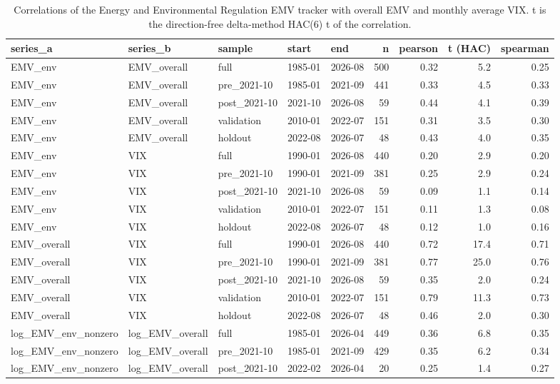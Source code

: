 \begin{table}
\caption{Correlations of the Energy and Environmental Regulation EMV tracker with overall EMV and monthly average VIX. t is the direction-free delta-method HAC(6) t of the correlation.}
\label{tab:m1_decomp_corr}
\begin{tabular}{lllllrrrr}
\toprule
series\_a & series\_b & sample & start & end & n & pearson & t (HAC) & spearman \\
\midrule
EMV\_env & EMV\_overall & full & 1985-01 & 2026-08 & 500 & 0.32 & 5.2 & 0.25 \\
EMV\_env & EMV\_overall & pre\_2021-10 & 1985-01 & 2021-09 & 441 & 0.33 & 4.5 & 0.33 \\
EMV\_env & EMV\_overall & post\_2021-10 & 2021-10 & 2026-08 & 59 & 0.44 & 4.1 & 0.39 \\
EMV\_env & EMV\_overall & validation & 2010-01 & 2022-07 & 151 & 0.31 & 3.5 & 0.30 \\
EMV\_env & EMV\_overall & holdout & 2022-08 & 2026-07 & 48 & 0.43 & 4.0 & 0.35 \\
EMV\_env & VIX & full & 1990-01 & 2026-08 & 440 & 0.20 & 2.9 & 0.20 \\
EMV\_env & VIX & pre\_2021-10 & 1990-01 & 2021-09 & 381 & 0.25 & 2.9 & 0.24 \\
EMV\_env & VIX & post\_2021-10 & 2021-10 & 2026-08 & 59 & 0.09 & 1.1 & 0.14 \\
EMV\_env & VIX & validation & 2010-01 & 2022-07 & 151 & 0.11 & 1.3 & 0.08 \\
EMV\_env & VIX & holdout & 2022-08 & 2026-07 & 48 & 0.12 & 1.0 & 0.16 \\
EMV\_overall & VIX & full & 1990-01 & 2026-08 & 440 & 0.72 & 17.4 & 0.71 \\
EMV\_overall & VIX & pre\_2021-10 & 1990-01 & 2021-09 & 381 & 0.77 & 25.0 & 0.76 \\
EMV\_overall & VIX & post\_2021-10 & 2021-10 & 2026-08 & 59 & 0.35 & 2.0 & 0.24 \\
EMV\_overall & VIX & validation & 2010-01 & 2022-07 & 151 & 0.79 & 11.3 & 0.73 \\
EMV\_overall & VIX & holdout & 2022-08 & 2026-07 & 48 & 0.46 & 2.0 & 0.30 \\
log\_EMV\_env\_nonzero & log\_EMV\_overall & full & 1985-01 & 2026-04 & 449 & 0.36 & 6.8 & 0.35 \\
log\_EMV\_env\_nonzero & log\_EMV\_overall & pre\_2021-10 & 1985-01 & 2021-09 & 429 & 0.35 & 6.2 & 0.34 \\
log\_EMV\_env\_nonzero & log\_EMV\_overall & post\_2021-10 & 2022-02 & 2026-04 & 20 & 0.25 & 1.4 & 0.27 \\

\end{tabular}
\end{table}
